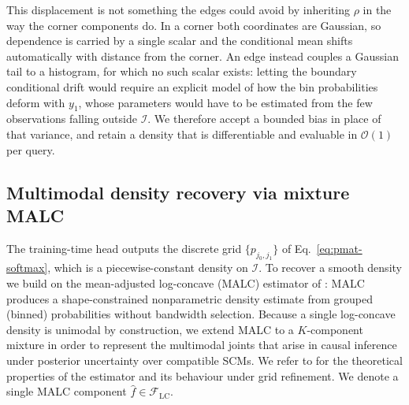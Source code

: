 \documentclass[11pt]{article}
\theoremstyle{plain}
\theoremstyle{definition}
\theoremstyle{remark}
\begin{document}
This displacement is not something the edges could avoid by inheriting
$\rho$ in the way the corner components do. In a corner both
coordinates are Gaussian, so dependence is carried by a single scalar
and the conditional mean shifts automatically with distance from the
corner. An edge instead couples a Gaussian tail to a histogram, for
which no such scalar exists: letting the boundary conditional drift
would require an explicit model of how the bin probabilities deform
with $y_1$, whose parameters would have to be estimated from the few
observations falling outside $\mathcal{I}$. We therefore accept a
bounded bias in place of that variance, and retain a density that is
differentiable and evaluable in $\mathcal{O}(1)$ per query.


\subsection{Multimodal density recovery via mixture MALC}
\label{sec:malc-multimodal}

The training-time head outputs the discrete grid
$\{p_{j_0, j_1}\}$ of Eq.~\eqref{eq:pmat-softmax}, which is a
piecewise-constant density on $\mathcal{I}$. To recover a smooth
density we build on the mean-adjusted log-concave (MALC) estimator of
\citet{danisman2026malc}: MALC produces a shape-constrained
nonparametric density estimate from grouped (binned) probabilities
without bandwidth selection. Because a single log-concave density is
unimodal by construction, we extend MALC to a $K$-component mixture in
order to represent the multimodal joints that arise in causal
inference under posterior uncertainty over compatible SCMs.  We refer to \citet{danisman2026malc} for
the theoretical properties of the estimator and its behaviour under
grid refinement. We denote a single MALC component
$\hat{f} \in \mathcal{F}_{\mathrm{LC}}$.

\end{document}
